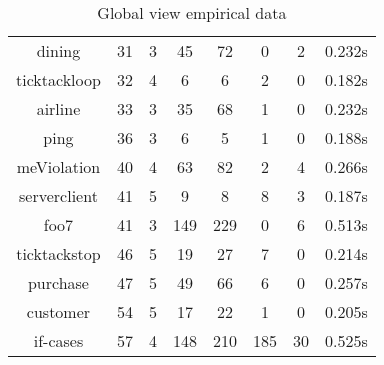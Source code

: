 \begin{table}[!ht]
\begin{tabular}{|c|c|c|c|c|c|c|c|}
dining & 31 & 3 & 45 & 72 & 0 & 2 & 0.232s \\ 
ticktackloop & 32 & 4 & 6 & 6 & 2 & 0 & 0.182s \\ 
airline & 33 & 3 & 35 & 68 & 1 & 0 & 0.232s \\ 
ping & 36 & 3 & 6 & 5 & 1 & 0 & 0.188s \\ 
meViolation & 40 & 4 & 63 & 82 & 2 & 4 & 0.266s \\ 
serverclient & 41 & 5 & 9 & 8 & 8 & 3 & 0.187s \\ 
foo7 & 41 & 3 & 149 & 229 & 0 & 6 & 0.513s \\ 
ticktackstop & 46 & 5 & 19 & 27 & 7 & 0 & 0.214s \\ 
purchase & 47 & 5 & 49 & 66 & 6 & 0 & 0.257s \\ 
customer & 54 & 5 & 17 & 22 & 1 & 0 & 0.205s \\ 
if-cases & 57 & 4 & 148 & 210 & 185 & 30 & 0.525s \\ 
\hline
\end{tabular}
\caption{Global view empirical data}
\label{tab:gvbench}
\end{table}